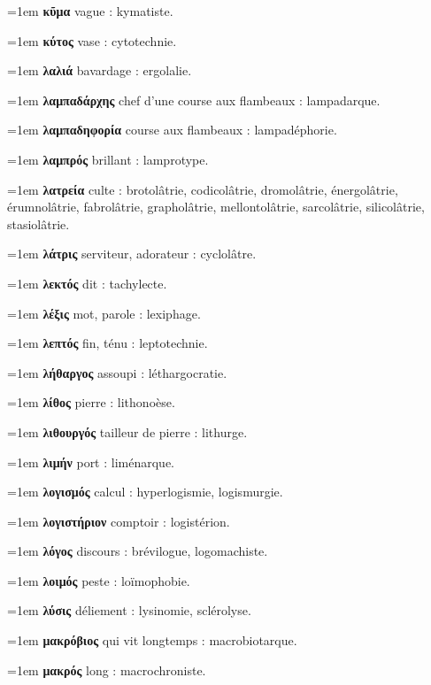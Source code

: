\hangindent=1em \textbf{κῦμα} vague : kymatiste.\par
\hangindent=1em \textbf{κύτος} vase : cytotechnie.\par
\hangindent=1em \textbf{λαλιά} bavardage : ergolalie.\par
\hangindent=1em \textbf{λαμπαδάρχης} chef d'une course aux flambeaux : lampadarque.\par
\hangindent=1em \textbf{λαμπαδηφορία} course aux flambeaux : lampadéphorie.\par
\hangindent=1em \textbf{λαμπρός} brillant : lamprotype.\par
\hangindent=1em \textbf{λατρεία} culte : brotolâtrie, codicolâtrie, dromolâtrie, énergolâtrie, érumnolâtrie, fabrolâtrie, grapholâtrie, mellontolâtrie, sarcolâtrie, silicolâtrie, stasiolâtrie.\par
\hangindent=1em \textbf{λάτρις} serviteur, adorateur : cyclolâtre.\par
\hangindent=1em \textbf{λεκτός} dit : tachylecte.\par
\hangindent=1em \textbf{λέξις} mot, parole : lexiphage.\par
\hangindent=1em \textbf{λεπτός} fin, ténu : leptotechnie.\par
\hangindent=1em \textbf{λήθαργος} assoupi : léthargocratie.\par
\hangindent=1em \textbf{λίθος} pierre : lithonoèse.\par
\hangindent=1em \textbf{λιθουργός} tailleur de pierre : lithurge.\par
\hangindent=1em \textbf{λιμήν} port : liménarque.\par
\hangindent=1em \textbf{λογισμός} calcul : hyperlogismie, logismurgie.\par
\hangindent=1em \textbf{λογιστήριον} comptoir : logistérion.\par
\hangindent=1em \textbf{λόγος} discours : brévilogue, logomachiste.\par
\hangindent=1em \textbf{λοιμός} peste : loïmophobie.\par
\hangindent=1em \textbf{λύσις} déliement : lysinomie, sclérolyse.\par
\hangindent=1em \textbf{μακρόβιος} qui vit longtemps : macrobiotarque.\par
\hangindent=1em \textbf{μακρός} long : macrochroniste.\par
